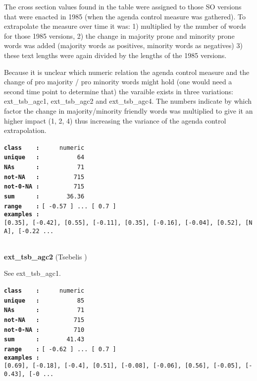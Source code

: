 \documentclass[]{article}
\begin{document}
The cross section values found in the table were assigned to those SO
versions that were enacted in 1985 (when the agenda control measure was
gathered). To extrapolate the measure over time it was: 1) multiplied by
the number of words for those 1985 versions, 2) the change in majority
prone and minority prone words was added (majority words as positives,
minority words as negatives) 3) these text lengths were again divided by
the lengths of the 1985 versions.

Because it is unclear which numeric relation the agenda control measure
and the change of pro majority / pro minority words might hold (one
would need a second time point to determine that) the varaible exists in
three variations: ext\_tsb\_agc1, ext\_tsb\_agc2 and ext\_tsb\_agc4. The
numbers indicate by which factor the change in majority/minority
friendly words was multiplied to give it an higher impact (1, 2, 4) thus
increasing the variance of the agenda control extrapolation.

\textbf{\texttt{class\ \ \ \ :}} \texttt{~~~~~numeric}\\
\textbf{\texttt{unique\ \ \ :}} \texttt{~~~~~~~~~~64}\\
\textbf{\texttt{NAs\ \ \ \ \ \ :}} \texttt{~~~~~~~~~~71}\\
\textbf{\texttt{not-NA\ \ \ :}} \texttt{~~~~~~~~~715}\\
\textbf{\texttt{not-0-NA\ :}} \texttt{~~~~~~~~~715}\\
\textbf{\texttt{sum\ \ \ \ \ \ :}} \texttt{~~~~~~~36.36}\\
\textbf{\texttt{range\ \ \ \ :}}
\texttt{{[}\ -0.57\ {]}\ ...\ {[}\ 0.7\ {]}}\\
\textbf{\texttt{examples\ :}}
\texttt{{[}0.35{]},\ {[}-0.42{]},\ {[}0.55{]},\ {[}-0.11{]},\ {[}0.35{]},\ {[}-0.16{]},\ {[}-0.04{]},\ {[}0.52{]},\ {[}NA{]},\ {[}-0.22\ ...}\\

~

\textbf{ext\_tsb\_agc2} (Tsebelis )

See ext\_tsb\_agc1.

\textbf{\texttt{class\ \ \ \ :}} \texttt{~~~~~numeric}\\
\textbf{\texttt{unique\ \ \ :}} \texttt{~~~~~~~~~~85}\\
\textbf{\texttt{NAs\ \ \ \ \ \ :}} \texttt{~~~~~~~~~~71}\\
\textbf{\texttt{not-NA\ \ \ :}} \texttt{~~~~~~~~~715}\\
\textbf{\texttt{not-0-NA\ :}} \texttt{~~~~~~~~~710}\\
\textbf{\texttt{sum\ \ \ \ \ \ :}} \texttt{~~~~~~~41.43}\\
\textbf{\texttt{range\ \ \ \ :}}
\texttt{{[}\ -0.62\ {]}\ ...\ {[}\ 0.7\ {]}}\\
\textbf{\texttt{examples\ :}}
\texttt{{[}0.69{]},\ {[}-0.18{]},\ {[}-0.4{]},\ {[}0.51{]},\ {[}-0.08{]},\ {[}-0.06{]},\ {[}0.56{]},\ {[}-0.05{]},\ {[}-0.43{]},\ {[}-0\ ...}\\
\end{document}
